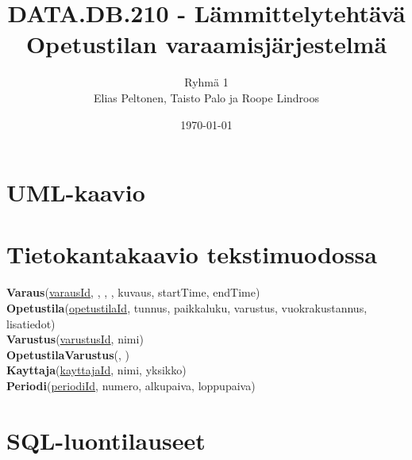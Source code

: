 \documentclass[11pt,a4paper]{article}
\title{DATA.DB.210 - Lämmittelytehtävä \\ \large Opetustilan varaamisjärjestelmä}
\author{Ryhmä 1 \\ \small Elias Peltonen, Taisto Palo ja Roope Lindroos}
\date{\today}
\begin{document}
\maketitle

\section*{UML-kaavio}


\newpage

\section*{Tietokantakaavio tekstimuodossa}

\noindent
\textbf{Varaus}(\underline{varausId}, , , , kuvaus, startTime, endTime) \\[0.5em]
\textbf{Opetustila}(\underline{opetustilaId}, tunnus, paikkaluku, varustus, vuokrakustannus, lisatiedot) \\[0.5em]
\textbf{Varustus}(\underline{varustusId}, nimi) \\[0.5em]
\textbf{OpetustilaVarustus}(, ) \\[0.5em]
\textbf{Kayttaja}(\underline{kayttajaId}, nimi, yksikko) \\[0.5em]
\textbf{Periodi}(\underline{periodiId}, numero, alkupaiva, loppupaiva) \\[0.5em]

\section*{SQL-luontilauseet}
\inputminted{sql}{assets/create.sql}
\end{document}
